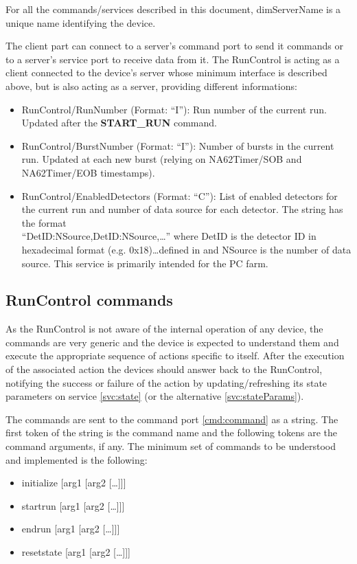 \documentclass[a4paper]{article}
\begin{document}
For all the commands/services described in this document, dimServerName is a unique name identifying
the device.

The client part can connect to a server's command port to send it commands or to a server's
service port to receive data from it. The RunControl is acting as a client connected to the device's
server whose minimum interface is described above, but is also acting as a server, providing different informations:
\begin{itemize}
	\item RunControl/RunNumber (Format: ``I''): Run number of the current run.
	Updated after the \textbf{START\_RUN} command.
	\item RunControl/BurstNumber (Format: ``I''): Number of bursts in the current
	run. Updated at each new burst (relying on NA62Timer/SOB and NA62Timer/EOB
	timestamps).
	\item RunControl/EnabledDetectors (Format: ``C''): List of enabled detectors for the current run
	and number of data source for each detector. The string has the format\\ 
	\mbox{``DetID:NSource,DetID:NSource,\ldots''} where DetID is the detector ID in hexadecimal format
	(e.g. 0x18)\ldots defined in \cite{biblio:TDAQNote} and NSource is the number of data source. This
	service is primarily intended for the PC farm.
\end{itemize}

\subsection{RunControl commands}\label{sec:commands}

As the RunControl is not aware of the internal operation of any device, the commands are very
generic and the device is expected to understand them and execute the appropriate sequence of actions
specific to itself. After the execution of the associated action the devices should answer back to
the RunControl, notifying the success or failure of the action by updating/refreshing its state
parameters on service \ref{svc:state} (or the alternative \ref{svc:stateParams}).

The commands are sent to the command port \ref{cmd:command} as a string. The first token of the
string is the command name and the following tokens are the command arguments, if any. The minimum
set of commands to be understood and implemented is the following:
\begin{itemize}
	\item initialize [arg1 [arg2 [\ldots]]]
	\item startrun [arg1 [arg2 [\ldots]]]
	\item endrun [arg1 [arg2 [\ldots]]]
	\item resetstate [arg1 [arg2 [\ldots]]]
\end{itemize}
\end{document}
